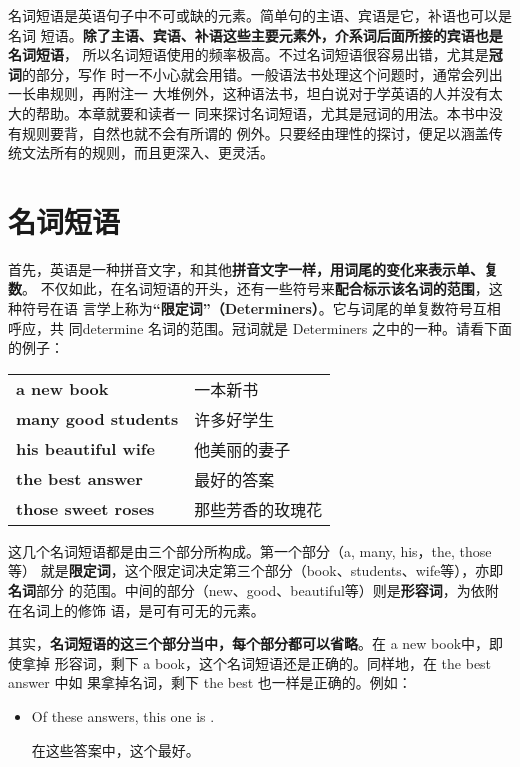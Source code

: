 \documentclass{yufa}
\newcommand\unbf[1]{\CJKunderline[thickness=0.8pt, textformat=\bfseries]{#1}}
\begin{document}
名词短语是英语句子中不可或缺的元素。简单句的主语、宾语是它，补语也可以是名词
短语。\textbf{除了主语、宾语、补语这些主要元素外，介系词后面所接的宾语也是名词短语}，
所以名词短语使用的频率极高。不过名词短语很容易出错，尤其是\textbf{冠词}的部分，写作
时一不小心就会用错。一般语法书处理这个问题时，通常会列出一长串规则，再附注一
大堆例外，这种语法书，坦白说对于学英语的人并没有太大的帮助。本章就要和读者一
同来探讨名词短语，尤其是冠词的用法。本书中没有规则要背，自然也就不会有所谓的
例外。只要经由理性的探讨，便足以涵盖传统文法所有的规则，而且更深入、更灵活。

\section{名词短语}

首先，英语是一种拼音文字，和其他\textbf{拼音文字一样，用词尾的变化来表示单、复数}。
不仅如此，在名词短语的开头，还有一些符号来\textbf{配合标示该名词的范围}，这种符号在语
言学上称为\textbf{“限定词”（Determiners）}。它与词尾的单复数符号互相呼应，共
同determine 名词的范围。冠词就是 Determiners 之中的一种。请看下面的例子：

\begin{table}[]
  \centering
  \begin{tabular}{ll}
    \textbf{a new book}         & 一本新书     \\
    \textbf{many good  students} & 许多好学生    \\
    \textbf{his beautiful wife} & 他美丽的妻子   \\
    \textbf{the best answer}    & 最好的答案    \\
    \textbf{those sweet roses}  & 那些芳香的玫瑰花
  \end{tabular}
\end{table}

这几个名词短语都是由三个部分所构成。第一个部分（a, many, his，the, those等）
就是\textbf{限定词}，这个限定词决定第三个部分（book、students、wife等），亦即\textbf{名词}部分
的范围。中间的部分（new、good、beautiful等）则是\textbf{形容词}，为依附在名词上的修饰
语，是可有可无的元素。

其实，\textbf{名词短语的这三个部分当中，每个部分都可以省略}。在 a new book中，即使拿掉
形容词，剩下 a book，这个名词短语还是正确的。同样地，在 the best answer 中如
果拿掉名词，剩下 the best 也一样是正确的。例如：
\begin{itemize}
\item Of these answers, this one is \unbf{the best}.

  在这些答案中，这个最好。
\end{itemize}
\end{document}
